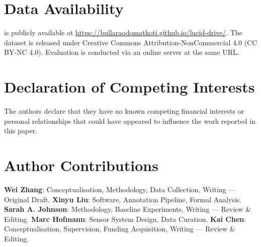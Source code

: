 \section*{Data Availability}

\lucid{} is publicly available at \url{https://bullaraodomathoti.github.io/lucid-drive/}. The dataset
is released under Creative Commons Attribution-NonCommercial 4.0 (CC BY-NC 4.0).
Evaluation is conducted via an online server at the same URL.

\section*{Declaration of Competing Interests}

The authors declare that they have no known competing financial interests or personal
relationships that could have appeared to influence the work reported in this paper.

\section*{Author Contributions}

\textbf{Wei Zhang}: Conceptualisation, Methodology, Data Collection, Writing --- Original Draft.
\textbf{Xinyu Liu}: Software, Annotation Pipeline, Formal Analysis.
\textbf{Sarah A. Johnson}: Methodology, Baseline Experiments, Writing --- Review \& Editing.
\textbf{Marc Hofmann}: Sensor System Design, Data Curation.
\textbf{Kai Chen}: Conceptualisation, Supervision, Funding Acquisition, Writing --- Review \& Editing.
